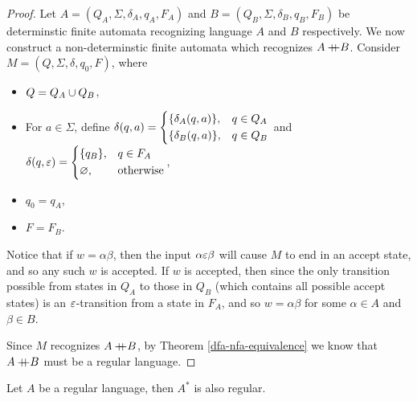 \begin{proof}
    Let $A = (Q_A, \Sigma, \delta_A, q_A, F_A)$ and $B = (Q_B, \Sigma, \delta_B, q_B, F_B)$ be determinstic finite automata recognizing language $A$ and $B$ respectively. We now construct a non-determinstic finite automata which recognizes $A +\mkern-12mu+ B$. Consider $M = \left(Q, \Sigma, \delta, q_0, F\right)$, where
    \begin{itemize}
        \item $Q = Q_A \cup Q_B$,
        \item For $a \in \Sigma$, define $\delta(q, a) = \begin{dcases}
            \{\delta_A(q, a)\}, &q \in Q_A \\
            \{\delta_B(q, a)\}, &q \in Q_B \\
        \end{dcases}$ and $\delta(q, \varepsilon) = \begin{dcases}
            \{q_B\}, &q \in F_A \\
            \varnothing, &\textrm{otherwise} \\
        \end{dcases}$,
        \item $q_0 = q_A$,
        \item $F = F_B$.
    \end{itemize}
    Notice that if $w = \alpha\beta$, then the input $\alpha\varepsilon\beta$ will cause $M$ to end in an accept state, and so any such $w$ is accepted. If $w$ is accepted, then since the only transition possible from states in $Q_A$ to those in $Q_B$ (which contains all possible accept states) is an $\varepsilon$-transition from a state in $F_A$, and so $w = \alpha\beta$ for some $\alpha \in A$ and $\beta \in B$.

    Since $M$ recognizes $A +\mkern-12mu+ B$, by Theorem \ref{dfa-nfa-equivalence} we know that $A +\mkern-12mu+ B$ must be a regular language.
\end{proof}

\begin{thm}\label{regular-language-kleene-star}
    Let $A$ be a regular language, then $A^{*}$ is also regular.
\end{thm}

